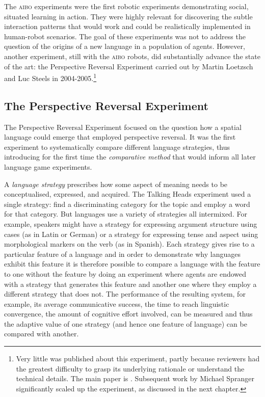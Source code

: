 The \textsc{aibo} experiments were the first robotic experiments demonstrating social, situated learning in action. 
They were highly relevant for discovering the subtle interaction patterns that would work and 
could be realistically implemented in human-robot scenarios. The goal of these experiments was 
not to address the question of the origins of a 
new language in a population of agents. However, another experiment, still with the \textsc{aibo} robots,  
did substantially advance the state of the art: the Perspective Reversal Experiment carried out by Martin Loetzsch 
and Luc Steels in 2004-2005.\footnote{
Very little was published about this experiment, partly because reviewers had the greatest difficulty to grasp 
its underlying rationale or understand the technical details. The main paper is \cite{Steels:2008spatial}. 
Subsequent work by Michael Spranger significantly scaled up the experiment, as discussed in the next chapter.}

\subsection{The Perspective Reversal Experiment}

The Perspective Reversal Experiment  focused on the question how a spatial language could emerge that employed
perspective reversal. It was the first experiment to systematically compare different language strategies, thus 
introducing for the first time the {\itshape comparative method}  
that would inform all later language game experiments. 

A {\itshape language strategy}  
prescribes how some aspect of meaning needs to be conceptualised, expressed, and acquired. 
The Talking Heads experiment used a single strategy: find a discriminating category for the topic and employ a word 
for that category. But languages use a variety of strategies all intermixed. 
For example, speakers might have a strategy for expressing argument structure using cases (as in Latin or German) or 
a strategy for expressing tense and aspect using morphological markers on the verb (as in Spanish). Each strategy gives 
rise to a particular feature of a language and in order to demonstrate why languages exhibit this feature it is therefore
possible to compare a language with the feature to one without the feature by doing an experiment where
agents are endowed with a strategy that generates this feature and another one where they employ a different strategy
that does not. The performance of the resulting system, for example, its average communicative success, the time to reach 
linguistic convergence, the amount of cognitive effort involved, can be measured and thus the adaptive value of one 
strategy (and hence one feature of language) can be compared with another. 

